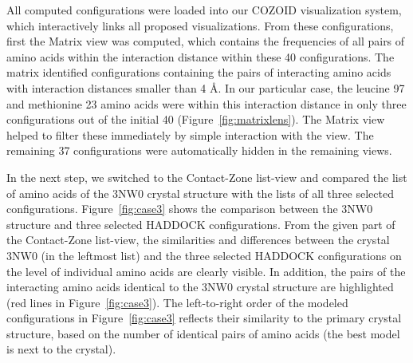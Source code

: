 \documentclass{bmcart}
\def\MatView {Matrix view\xspace}
\def\CoZoListView {Contact-Zone list-view\xspace}
\begin{document}
All computed configurations were loaded into our COZOID visualization system, which interactively links all proposed visualizations.
From these configurations, first the \MatView was computed, which contains the frequencies of all pairs of amino acids within the interaction distance within these 40 configurations.
The matrix identified configurations containing the pairs of interacting amino acids with interaction distances smaller than 4 \AA.
In our particular case, the leucine 97 and methionine 23 amino acids were within this interaction distance in only three configurations out of the initial 40 (Figure~\ref{fig:matrixlens}). 
The Matrix view helped to filter these immediately by simple interaction with the view. 
The remaining 37 configurations were automatically hidden in the remaining views.


In the next step, we switched to the \CoZoListView and compared the list of amino acids of the 3NW0 crystal structure with the lists of all three selected configurations.
Figure~\ref{fig:case3} shows the comparison between the 3NW0 structure and three selected HADDOCK configurations.
From the given part of the \CoZoListView, the similarities and differences between the crystal 3NW0 (in the leftmost list) and the three selected HADDOCK configurations on the level of individual amino acids are clearly visible.
In addition, the pairs of the interacting amino acids identical to the 3NW0 crystal structure are highlighted (red lines in Figure~\ref{fig:case3}). 
The left-to-right order of the modeled configurations in Figure~\ref{fig:case3} reflects their similarity to the primary crystal structure, based on the number of identical pairs of amino acids (the best model is next to the crystal).
\end{document}
